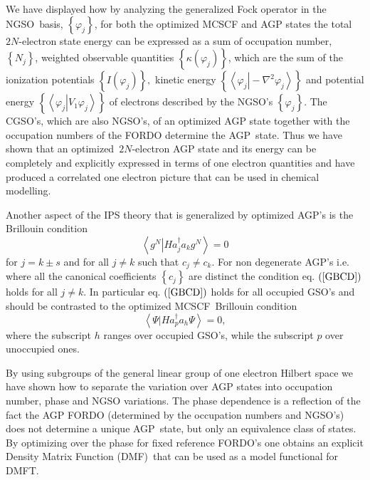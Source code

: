 \documentclass[aps,preprint]{revtex4}%
\begin{document}
We have displayed how by analyzing the generalized Fock operator in the
NGSO\ basis, $\left\{  \varphi_{j}\right\}  $, for both the optimized MCSCF
and AGP states the total $2N$-electron state energy can be expressed as a sum
of occupation number, $\left\{  N_{j}\right\}  $, weighted observable
quantities $\left\{  \kappa\left(  \varphi_{j}\right)  \right\}  $, which are
the sum of the ionization potentials $\left\{  I\left(  \varphi_{j}\right)
\right\}  ,$ kinetic energy $\left\{  \left\langle \left.  \varphi
_{j}\right\vert -\nabla^{2}\varphi_{j}\right\rangle \right\}  $ and potential
energy $\left\{  \left\langle \left.  \varphi_{j}\right\vert V_{1}\varphi
_{j}\right\rangle \right\}  $ of electrons described by the NGSO's $\left\{
\varphi_{j}\right\}  $. The CGSO's, which are also NGSO's, of an optimized AGP
state together with the occupation numbers of the FORDO determine the
AGP\ state. Thus we have shown that an optimized~$2N$-electron AGP state and
its energy can be completely and explicitly expressed in terms of one electron
quantities and have produced a correlated one electron picture that can be
used in chemical modelling.

Another aspect of the IPS theory that is generalized by optimized AGP's is the
Brillouin condition
\begin{equation}
\left\langle \left.  g^{N}\right\vert Ha_{j}^{\dagger}a_{k}g^{N}\right\rangle
=0 \label{GBCD}%
\end{equation}
for $j=k\pm s$ and for all $j\neq k$ such that $c_{j}\neq c_{k}$. For non
degenerate AGP's i.e. where all the canonical coefficients $\left\{
c_{j}\right\}  $ are distinct the condition eq. $\left(  \ref{GBCD}\right)  $
holds for all $j\neq k$. In particular eq. $\left(  \ref{GBCD}\right)  $ holds
for all occupied GSO's and should be contrasted to the optimized
MCSCF\ Brillouin condition
\begin{equation}
\left\langle \left.  \Psi\right\vert Ha_{p}^{\dagger}a_{h}\Psi\right\rangle
=0,
\end{equation}
where the subscript $h$ ranges over occupied GSO's, while the subscript $p$
over unoccupied ones.

By using subgroups of the general linear group of one electron Hilbert space
we have shown how to separate the variation over AGP states into occupation
number, phase and NGSO variations. The phase dependence is a reflection of the
fact the AGP FORDO (determined by the occupation numbers and NGSO's) does not
determine a unique AGP\ state, but only an equivalence class of states. By
optimizing over the phase for fixed reference FORDO's one obtains an explicit
Density Matrix Function (DMF)\ that can be used as a model functional for DMFT.
\end{document}
